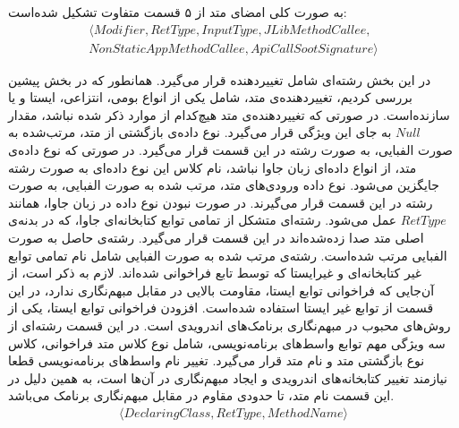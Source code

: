 به صورت کلی امضای متد از ۵ قسمت متفاوت تشکیل شده‌است:
\begin{equation}
\begin{split}
\langle Modifier,RetType,InputType,JLibMethodCallee,\\
NonStaticAppMethodCallee,ApiCallSootSignature\rangle
\end{split}
\end{equation}

 در این بخش رشته‌ای شامل تغییردهنده‌‌ قرار می‌گیرد. همانطور که در بخش پیشین بررسی کردیم، تغییردهنده‌ی متد، شامل یکی از انواع بومی، انتزاعی، ایستا و یا سازنده‌است. در صورتی که تغییردهنده‌ی متد هیچ‌کدام از موارد ذکر شده نباشد، مقدار $Null$ به جای این ویژگی قرار می‌گیرد.
 نوع داده‌ی بازگشتی از متد، مرتب‌شده به صورت الفبایی، به صورت رشته در این قسمت قرار می‌گیرد. در صورتی که نوع داده‌ی متد، از انواع داده‌ای زبان جاوا نباشد، نام کلاس این نوع داده‌ای به صورت رشته جایگزین می‌شود.
 نوع داده‌ ورودی‌های متد، مرتب شده به صورت الفبایی، به صورت رشته در این قسمت قرار می‌گیرند. در صورت نبودن نوع داده در زبان جاوا، همانند $RetType$ عمل می‌شود.
 رشته‌ای متشکل از تمامی توابع کتابخانه‌ای جاوا، که در بدنه‌ی اصلی متد صدا زده‌شده‌اند در این قسمت قرار می‌گیرد. رشته‌ی حاصل به صورت الفبایی مرتب شده‌است.
 رشته‌ی مرتب شده به صورت الفبایی شامل نام تمامی توابع غیر کتابخانه‌ای و غیرایستا که توسط تابع فراخوانی شده‌اند. لازم به ذکر است، از آن‌جایی که فراخوانی توابع ایستا، مقاومت بالایی در مقابل مبهم‌نگاری ندارد، در این قسمت از توابع غیر ایستا استفاده شده‌است. افزودن فراخوانی توابع ایستا، یکی از روش‌های محبوب در مبهم‌نگاری برنامک‌های اندرویدی است.
 در این قسمت رشته‌ای از سه ویژگی مهم توابع واسط‌های برنامه‌نویسی، شامل نوع کلاس متد فراخوانی، کلاس نوع بازگشتی متد و نام متد قرار می‌گیرد. تغییر نام واسط‌های برنامه‌نویسی قطعا نیازمند تغییر کتابخانه‌های اندرویدی و ایجاد مبهم‌نگاری در آن‌ها است، به همین دلیل در این قسمت نام متد، تا حدودی مقاوم در مقابل مبهم‌نگاری برنامک می‌باشد.
\begin{equation}
\begin{split}
\langle DeclaringClass,RetType,MethodName \rangle
\end{split}
\end{equation}

